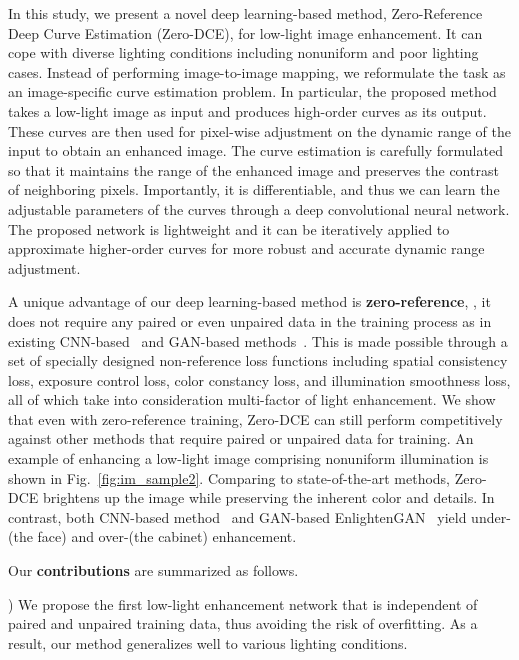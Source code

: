 \documentclass[10pt,twocolumn,letterpaper]{article}
\begin{document}
In this study, we present a novel deep learning-based method, Zero-Reference Deep Curve Estimation (Zero-DCE), for low-light image enhancement. It can cope with diverse lighting conditions including nonuniform and poor lighting cases.
Instead of performing image-to-image mapping, we reformulate the task as an image-specific curve estimation problem.
In particular, the proposed method takes a low-light image as input and produces high-order curves as its output. These curves are then used for pixel-wise adjustment on the dynamic range of the input to obtain an enhanced image.
The curve estimation is carefully formulated so that it maintains the range of the enhanced image and preserves the contrast of neighboring pixels. Importantly, it is differentiable, and thus we can learn the adjustable parameters of the curves through a deep convolutional neural network.
The proposed network is lightweight and it can be iteratively applied to approximate higher-order curves for more robust and accurate dynamic range adjustment.



A unique advantage of our deep learning-based method is \textbf{zero-reference}, \ie, it does not require any paired or even unpaired data in the training process as in existing CNN-based~\cite{Wang2019, Chen2018} and GAN-based methods~\cite{Jiang2019,CycleGAN}.
This is made possible through a set of specially designed non-reference loss functions including spatial consistency loss, exposure control loss, color constancy loss, and illumination smoothness loss, all of which take into consideration multi-factor of light enhancement.
We show that even with zero-reference training, Zero-DCE can still perform competitively against other methods that require paired or unpaired data for training.
An example of enhancing a low-light image comprising nonuniform illumination is shown in Fig.~\ref{fig:im_sample2}.
Comparing to state-of-the-art methods, Zero-DCE brightens up the image while preserving the inherent color and details. In contrast, both CNN-based method~\cite{Wang2019} and GAN-based EnlightenGAN~\cite{Jiang2019} yield under-(the face) and over-(the cabinet) enhancement.




Our \textbf{contributions} are summarized as follows.

)
We propose the first low-light enhancement network that is independent of paired and unpaired training data, thus avoiding the risk of overfitting. As a result, our method generalizes well to various lighting conditions.
\end{document}
